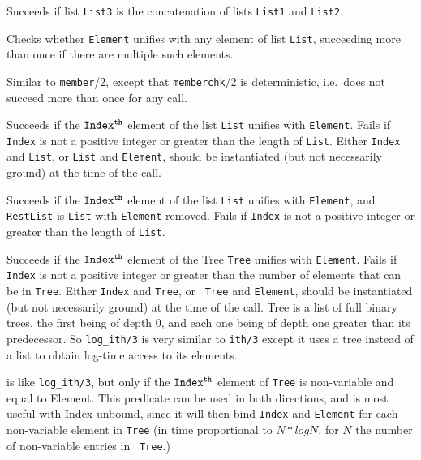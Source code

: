\begin{description}
    Succeeds if list {\tt List3} is the concatenation of lists 
    {\tt List1} and {\tt List2}.

    Checks whether {\tt Element} unifies with any element of list 
    {\tt List}, succeeding more than once if there are multiple 
    such elements.

    Similar to {\tt member}/2, except that {\tt memberchk}/2 is
    deterministic, i.e.\ does not succeed more than once for any call.

    Succeeds if the ${\tt Index^{th}}$ element of the list {\tt List} 
    unifies with {\tt Element}.  Fails if {\tt Index} is not a positive
    integer or greater than the length of {\tt List}.
    Either {\tt Index} and {\tt List}, or {\tt List} and {\tt Element}, 
    should be instantiated (but not necessarily ground) at the time of 
    the call.

    Succeeds if the ${\tt Index^{th}}$ element of the list {\tt List}
    unifies with {\tt Element}, and {\tt RestList} is {\tt List} with
    {\tt Element} removed.  Fails if {\tt Index} is not a positive
    integer or greater than the length of {\tt List}.

    Succeeds if the ${\tt Index^{th}}$ element of the Tree {\tt Tree}
    unifies with {\tt Element}.  Fails if {\tt Index} is not a
    positive integer or greater than the number of elements that can
    be in {\tt Tree}.  Either {\tt Index} and {\tt Tree}, or {\tt
    Tree} and {\tt Element}, should be instantiated (but not
    necessarily ground) at the time of the call.  Tree is a list of
    full binary trees, the first being of depth 0, and each one being
    of depth one greater than its predecessor.  So {\tt log\_ith/3} is
    very similar to {\tt ith/3} except it uses a tree instead of a
    list to obtain log-time access to its elements.

    is like {\tt log\_ith/3}, but only if the ${\tt Index^{th}}$ element
    of {\tt Tree} is non-variable and equal to Element.  This predicate
    can be used in both directions, and is most useful with Index
    unbound, since it will then bind {\tt Index} and {\tt Element} for
    each non-variable element in {\tt Tree} (in time proportional to
    $N*logN$, for $N$ the number of non-variable entries in {\tt
    Tree}.)


\end{description}
